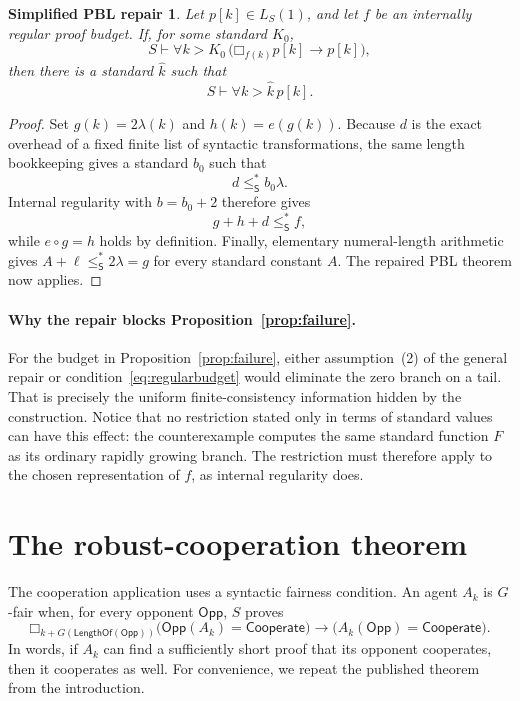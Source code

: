 \documentclass[11pt]{article}
\newtheorem*{simplerepair}{Simplified PBL repair}
\theoremstyle{definition}
\theoremstyle{remark}
\newcommand{\Sth}{\mathsf{S}}
\newcommand{\elln}{\ell}
\newcommand{\Boxb}[1]{\mathord{\Box}_{#1}}
\newcommand{\leSstar}{\mathrel{\leq_{\Sth}^{*}}}
\newcommand{\Coop}{\mathsf{Cooperate}}
\newcommand{\Len}{\mathsf{LengthOf}}
\begin{document}
\begin{simplerepair}
Let $p[k]\in L_S(1)$, and let $f$ be an internally regular proof budget.  If, for some standard $K_0$,
\[
  S\vdash\forall k>K_0\,
  \bigl(\Boxb{f(k)}p[k]\to p[k]\bigr),
\]
then there is a standard $\widehat{k}$ such that
\[
  S\vdash\forall k>\widehat{k}\,p[k].
\]
\end{simplerepair}

\begin{proof}
Set $g(k)=2\lambda(k)$ and $h(k)=e(g(k))$.  Because $d$ is the exact overhead of a fixed finite list of syntactic transformations, the same length bookkeeping gives a standard $b_0$ such that
\[
  d\leSstar b_0\lambda.
\]
Internal regularity with $b=b_0+2$ therefore gives
\[
  g+h+d\leSstar f,
\]
while $e\circ g=h$ holds by definition.  Finally, elementary numeral-length arithmetic gives $A+\elln\leSstar 2\lambda=g$ for every standard constant $A$.  The repaired PBL theorem now applies.
\end{proof}

\paragraph{Why the repair blocks Proposition~\ref{prop:failure}.}
For the budget in Proposition~\ref{prop:failure}, either assumption~(2) of the general repair or condition~\eqref{eq:regularbudget} would eliminate the zero branch on a tail.  That is precisely the uniform finite-consistency information hidden by the construction.  Notice that no restriction stated only in terms of standard values can have this effect: the counterexample computes the same standard function $F$ as its ordinary rapidly growing branch.  The restriction must therefore apply to the chosen representation of $f$, as internal regularity does.

\section{The robust-cooperation theorem}\label{sec:cooperation}

The cooperation application uses a syntactic fairness condition.  An agent $A_k$ is $G$-fair when, for every opponent $\mathsf{Opp}$, $S$ proves
\[
  \Boxb{k+G(\Len(\mathsf{Opp}))}
  \bigl(\mathsf{Opp}(A_k)=\Coop\bigr)
  \longrightarrow
  \bigl(A_k(\mathsf{Opp})=\Coop\bigr).
\]
In words, if $A_k$ can find a sufficiently short proof that its opponent cooperates, then it cooperates as well.  For convenience, we repeat the published theorem from the introduction.
\end{document}
